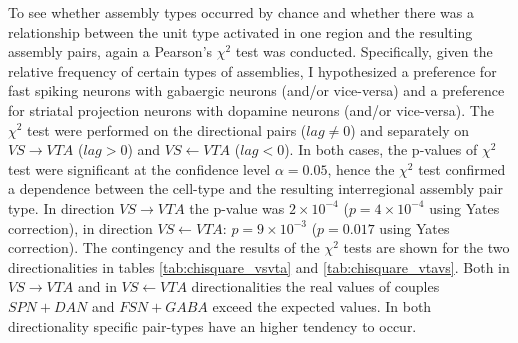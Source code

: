 To see whether assembly types occurred by chance and whether there was a relationship between the unit type activated in one region and the resulting assembly pairs, again a Pearson's $\chi^2$ test was conducted. Specifically, given the relative frequency of certain types of assemblies, I hypothesized a preference for fast spiking neurons with gabaergic neurons (and/or vice-versa) and a preference for striatal projection neurons with dopamine neurons (and/or vice-versa). The $\chi^2$ test were performed on the directional pairs ($lag\neq0$) and separately on $VS\rightarrow VTA$ ($lag>0$) and $VS\leftarrow VTA$ ($lag<0$). In both cases, the p-values of $\chi^2$ test were significant at the confidence level $\alpha = 0.05$, hence the $\chi^2$ test confirmed a dependence between the cell-type and the resulting interregional assembly pair type. In direction $VS\rightarrow VTA$ the p-value was $2\times10^{-4}$ ($p=4\times10^{-4}$ using Yates correction), in direction $VS\leftarrow VTA$: $p=9\times10^{-3}$ ($p=0.017$ using Yates correction). The contingency and the results of the $\chi^2$ tests are shown for the two directionalities in tables \ref{tab:chisquare_vsvta} and \ref{tab:chisquare_vtavs}. Both in $VS\rightarrow VTA$ and in $VS\leftarrow VTA$ directionalities the real values of couples $SPN+DAN$ and $FSN+GABA$ exceed the expected values. In both directionality specific pair-types have an higher tendency to occur.
